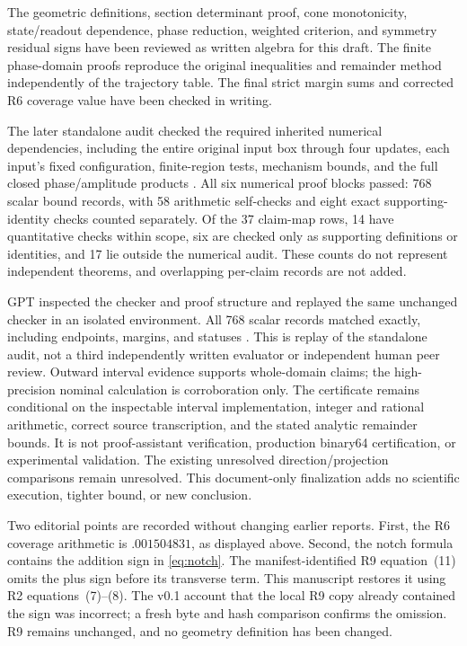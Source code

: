 \documentclass[11pt,a4paper]{article}
\numberwithin{equation}{section}
\begin{document}
The geometric definitions, section determinant proof, cone monotonicity,
state/readout dependence, phase reduction, weighted criterion, and symmetry
residual signs have been reviewed as written algebra for this draft.
The finite phase-domain proofs reproduce the original inequalities and
remainder method independently of the trajectory table. The final strict
margin sums and corrected R6 coverage value have been checked in writing.

The later standalone audit checked the required inherited numerical
dependencies, including the entire original input box through four updates,
each input's fixed configuration, finite-region tests, mechanism bounds,
and the full closed phase/amplitude products \cite{Audit}.
All six numerical proof blocks passed: 768 scalar bound records, with
58 arithmetic self-checks and eight exact supporting-identity checks counted
separately. Of the 37 claim-map rows, 14 have quantitative checks within scope,
six are checked only as supporting definitions or identities, and 17 lie
outside the numerical audit. These counts do not represent independent
theorems, and overlapping per-claim records are not added.

GPT inspected the checker and proof structure and replayed the same unchanged
checker in an isolated environment. All 768 scalar records matched exactly,
including endpoints, margins, and statuses \cite{GPTAudit}. This is replay
of the standalone audit, not a third independently written evaluator or
independent human peer review. Outward interval evidence supports whole-domain
claims; the high-precision nominal calculation is corroboration only.
The certificate remains conditional on the inspectable interval implementation,
integer and rational arithmetic, correct source transcription, and the stated
analytic remainder bounds. It is not proof-assistant verification, production
binary64 certification, or experimental validation. The existing unresolved
direction/projection comparisons remain unresolved. This document-only
finalization adds no scientific execution, tighter bound, or new conclusion.

Two editorial points are recorded without changing earlier reports.
First, the R6 coverage arithmetic is $.001504831$, as displayed above.
Second, the notch formula contains the addition sign in \eqref{eq:notch}.
The manifest-identified R9 equation~(11) omits the plus sign before its
transverse term. This manuscript restores it using R2 equations~(7)--(8).
The v0.1 account that the local R9 copy already contained the sign was
incorrect; a fresh byte and hash comparison confirms the omission.
R9 remains unchanged, and no geometry definition has been changed.
\end{document}
